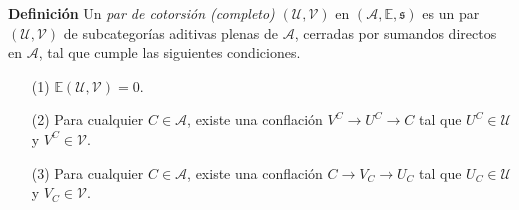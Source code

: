\documentclass[preview]{standalone}
\begin{document}
\begin{center}
\justifying \textbf{Definición} Un \emph{par de cotorsión (completo)} $(\mathcal{U}, \mathcal{V})$ en $(\mathscr{A}, \mathbb{E}, \mathfrak{s})$ es un par $(\mathcal{U}, \mathcal{V})$ de subcategorías aditivas plenas de $\mathscr{A}$, cerradas por sumandos directos en $\mathscr{A}$, tal que cumple las siguientes condiciones.\begin{itemize} \item[(1)] $\mathbb{E}(\mathcal{U}, \mathcal{V}) = 0$. \item[(2)] Para cualquier $C\in\mathscr{A}$, existe una conflación $V^C\to U^C\to C$ tal que $U^C\in\mathcal{U}$ y $V^C\in\mathcal{V}$. \item[(3)] Para cualquier $C\in\mathscr{A}$, existe una conflación $C\to V_C\to U_C$ tal que $U_C\in\mathcal{U}$ y $V_C\in\mathcal{V}$. \end{itemize}
\end{center}
\end{document}
